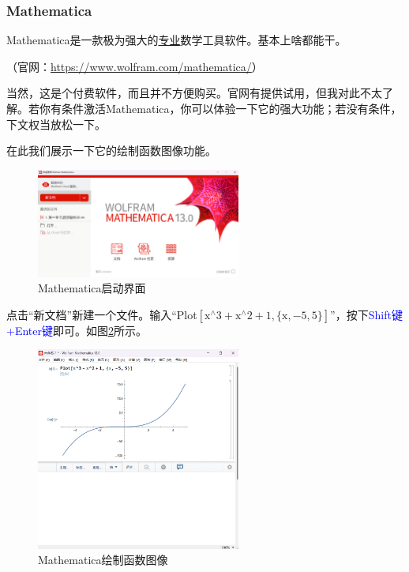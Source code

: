 \documentclass[lang=cn,math=cm,chinesefont=nofont,11pt,scheme=chinese,onecol]{elegantbook}
\begin{document}
\subsubsection{Mathematica}

Mathematica是一款极为强大的\underline{专业}数学工具软件。基本上啥都能干。

（官网：\href{https://www.wolfram.com/mathematica/}{https://www.wolfram.com/mathematica/}）

当然，这是个付费软件，而且并不方便购买。官网有提供试用，但我对此不太了解。若你有条件激活Mathematica，你可以体验一下它的强大功能；若没有条件，下文权当放松一下。

在此我们展示一下它的绘制函数图像功能。

\begin{figure}[h]
  \centering
  \includegraphics[width=0.6\textwidth]{image/mathematica1.png}
  \caption{Mathematica启动界面}
  \label{img:mathematica1}
\end{figure}

点击“新文档”新建一个文件。输入“Plot$\left[\text{x}^{\land}3+\text{x}^{\land}2+1,\{\text{x},-5,5\}\right]$”，按下\textcolor{blue}{Shift键+Enter键}即可。如图\ref{img:mathematica2}所示。

\begin{figure}[h]
  \centering
  \includegraphics[width=0.6\textwidth]{image/mathematica2.png}
  \caption{Mathematica绘制函数图像}
  \label{img:mathematica2}
\end{figure}
\end{document}
